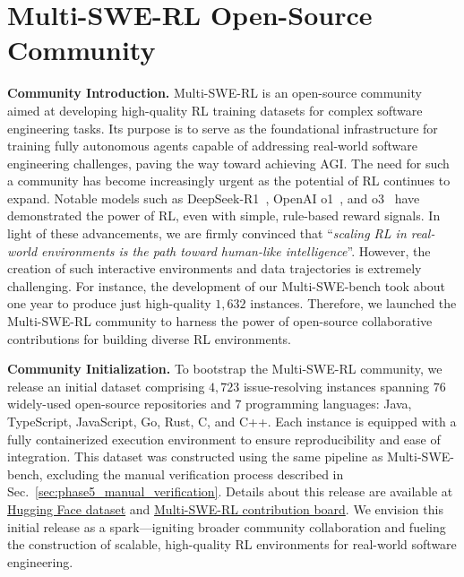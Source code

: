 \documentclass[11pt, a4paper, logo, copyright, nonumbering]{seed}
\newcommand{\multiswebench}{Multi-SWE-bench\xspace}
\newcommand{\multiswerl}{Multi-SWE-RL\xspace}
\begin{document}
\section{\multiswerl Open-Source Community}
\label{sec:multiswerl_opensource_community}

\noindent
\textbf{Community Introduction.}
\multiswerl is an open-source community aimed at developing high-quality RL training datasets for complex software engineering tasks.
Its purpose is to serve as the foundational infrastructure for training fully autonomous agents capable of addressing real-world software engineering challenges, paving the way toward achieving AGI.
% 
The need for such a community has become increasingly urgent as the potential of RL continues to expand.
Notable models such as DeepSeek-R1~\citep{deepseekr1}, OpenAI o1~\citep{openaio1}, and o3~\citep{openai_o3_mini} have demonstrated the power of RL, even with simple, rule-based reward signals.
In light of these advancements, we are firmly convinced that “\textit{scaling RL in real-world environments is the path toward human-like intelligence}”.
However, the creation of such interactive environments and data trajectories is extremely challenging.
For instance, the development of our \multiswebench took about one year to produce just high-quality $1,632$ instances.
Therefore, we launched the \multiswerl community to harness the power of open-source collaborative contributions for building diverse RL environments.

\noindent
\textbf{Community Initialization.}
To bootstrap the \multiswerl community, we release an initial dataset comprising $4,723$ issue-resolving instances spanning $76$ widely-used open-source repositories and $7$ programming languages: Java, TypeScript, JavaScript, Go, Rust, C, and C++.
Each instance is equipped with a fully containerized execution environment to ensure reproducibility and ease of integration.
% 
This dataset was constructed using the same pipeline as \multiswebench, excluding the manual verification process described in Sec.~\ref{sec:phase5_manual_verification}.
Details about this release are available at 
\href{https://huggingface.co/datasets/ByteDance-Seed/Multi-SWE-RL}{Hugging Face dataset} and \href{https://docs.google.com/spreadsheets/d/1C90SiRmlac3FizmsJzxzrhSNsnCjyYewdrXzFbBV4x0/edit?gid=493937140#gid=493937140}{\multiswerl contribution board}.
We envision this initial release as a spark—igniting broader community collaboration and fueling the construction of scalable, high-quality RL environments for real-world software engineering.
\end{document}
